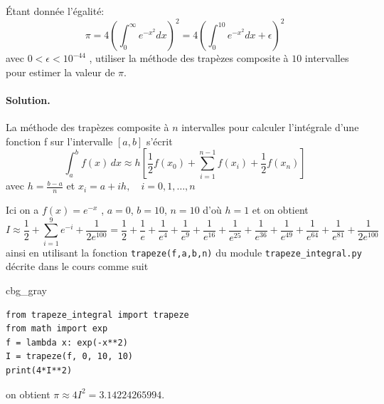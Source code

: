 \documentclass[%
oneside,                 %
final,                   %
10pt,french]{article}
\newenvironment{_cod_tight}[1]{
   \def\FrameCommand{\colorbox{#1}}
   \FrameRule0.6pt\MakeFramed {\FrameRestore}\vskip3mm}
   {\vskip0mm\endMakeFramed}
\newenvironment{cod}[1]{
\bgroup\rmfamily
\fboxsep=0mm\relax
\begin{_cod_tight}{#1}
\list{}{\parsep=-2mm\parskip=0mm\topsep=0pt\leftmargin=2mm
\rightmargin=2\leftmargin\leftmargin=4pt\relax}
\item\relax}
{\endlist\end{_cod_tight}\egroup}
\newenvironment{doconceexercise}{}{}
\newcounter{doconceexercisecounter}
\begin{document}


\begin{doconceexercise}



Étant donnée l'égalité:
\begin{equation}
\pi = 4 \left( \int_0^\infty e^{-x^2} dx \right)^2 = 4 \left( \int_0^{10} e^{-x^2} dx + \epsilon \right)^2
\end{equation}
avec $0 < \epsilon < 10^{−44}$ , utiliser la méthode des trapèzes composite à $10$ intervalles pour estimer la valeur de $\pi$.


\paragraph{Solution.}
La méthode des trapèzes composite à $n$ intervalles pour calculer l’intégrale d’une fonction f sur l’intervalle $[a, b]$ s’écrit
\begin{equation*}
\int_a^b f(x)\,dx \approx h \left[\frac{1}{2}f(x_0) + \sum_{i=1}^{n-1}f(x_i) + \frac{1}{2}f(x_n) \right]
\end{equation*}
avec $h = \frac{b-a}{n}$ et $x_i = a + ih,\quad i = 0,1,\ldots,n$

Ici on a $f (x) = e^{-x}$ , $a = 0$, $b = 10$, $n = 10$ d’où $h = 1$ et on obtient
\begin{equation*}
I \approx \frac{1}{2} + \sum_{i=1}^{9} e^{-i} + \frac{1}{2e^{100}} = \frac{1}{2} + \frac{1}{e} + \frac{1}{e^{4}} + \frac{1}{e^{9}} + \frac{1}{e^{16}} + \frac{1}{e^{25}} + \frac{1}{e^{36}} + \frac{1}{e^{49}} + \frac{1}{e^{64}} + \frac{1}{e^{81}} + \frac{1}{2e^{100}}
\end{equation*}
ainsi en utilisant la fonction \texttt{trapeze(f,a,b,n)} du module \Verb!trapeze_integral.py! décrite dans le cours comme suit
\begin{cod}{cbg_gray}\begin{verbatim}
from trapeze_integral import trapeze
from math import exp
f = lambda x: exp(-x**2)
I = trapeze(f, 0, 10, 10)
print(4*I**2)
\end{verbatim}
\end{cod}
\noindent
on obtient $\pi \approx 4I^2 = 3.14224265994$.


\end{doconceexercise}
\end{document}
